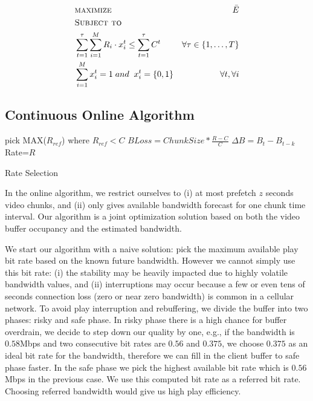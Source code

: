 \begin{subequations}
\begin{align*}
&\textsc{maximize }&\bar{E}\\ 
&\textsc{Subject to}\\
&\sum \limits_{t=1}^\tau  \sum \limits_{i=1}^M R_i \cdot x_i^t\leq\sum\limits_{t=1}^\tau C^t& \forall \tau \in \{1, \dots, T\}\\
&\sum \limits_{i=1}^M x_i^t =1\; and\;\; x_i^t = \{0,1\}&\forall t, \forall i
\end{align*}
\end{subequations}

\subsection{Continuous Online Algorithm} \label{subsec:online}
\begin{algorithm}[ht]
\SetAlgoLined
pick MAX($R_{ref}$) where $R_{ref}<C$\;
 {
 {
 $BLoss=ChunkSize*\frac{R-C}{C}$\;
 $\Delta B = B_{t} -B_{t-k} $\;
 {Rate=$R$}
 }
 }
\caption{Rate Selection} \label{cap:algorithm}
\end{algorithm} 

In the online algorithm, we restrict ourselves to (i) at most prefetch $z$ seconds video chunks, and (ii) only gives available bandwidth forecast for one chunk time interval. Our algorithm is a joint optimization solution based on both the video buffer occupancy and the estimated bandwidth. 

We start our algorithm with a naive solution: pick the maximum available play bit rate based on the known future bandwidth. However we cannot simply use this bit rate: (i) the stability may be heavily impacted due to highly volatile bandwidth values, and (ii) interruptions may occur because a few or even tens of seconds connection loss (zero or near zero bandwidth) is common in a cellular network. To avoid play interruption and rebuffering, we divide the buffer into two phases: risky and safe phase. In risky phase there is a high chance for buffer overdrain, we decide to step down our quality by one, e.g., if the bandwidth is $0.58$Mbps and two consecutive bit rates are $0.56$ and $0.375$, we choose $ 0.375$ as an ideal bit rate for the bandwidth, therefore we can fill in the client buffer to safe phase faster. In the safe phase we pick the highest available bit rate which is $0.56$Mbps in the previous case. We use this computed bit rate as a referred bit rate. Choosing referred bandwidth would give us high play efficiency. 

